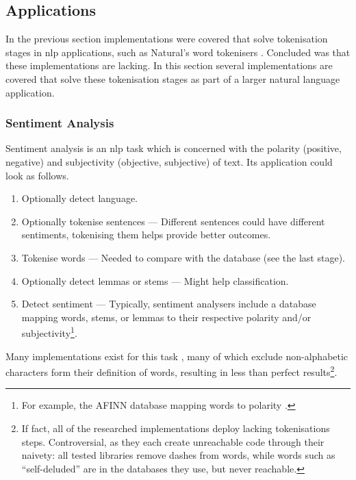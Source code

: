 \begin{enumerate}
\subsection{Applications}\label{applications}

In the previous section implementations were covered that solve
tokenisation stages in \gls{nlp} applications, such as Natural's word
tokenisers \autocite{NaturalNode/natural-source-code}. Concluded was
that these implementations are lacking. In this section several
implementations are covered that solve these tokenisation stages as part
of a larger natural language application.

\subsubsection{Sentiment Analysis}\label{sentiment-analysis}

Sentiment analysis is an \gls{nlp} task which is concerned with the
polarity (positive, negative) and subjectivity (objective, subjective)
of text. Its application could look as follows.

\begin{enumerate}
\item
  Optionally detect language.
\item
  Optionally tokenise sentences --- Different sentences could have
  different sentiments, tokenising them helps provide better outcomes.
\item
  Tokenise words --- Needed to compare with the database (see the last
  stage).
\item
  Optionally detect lemmas or stems --- Might help classification.
\item
  Detect sentiment --- Typically, sentiment analysers include a database
  mapping words, stems, or lemmas to their respective polarity and\slash or
  subjectivity\footnote{For example, the AFINN database mapping words to
    polarity \autocite{nielsen-finn-arup-afinn}.}.
\end{enumerate}

Many implementations exist for this task \autocites[e.g.,][]
{thinkroth/sentimental-source-code}{mileszim/sediment-source-code}
{thisandagain/sentiment-source-code}, many of which exclude non-alphabetic
characters form their definition of words, resulting in less than perfect
results\footnote{If fact, all of
  the researched implementations deploy lacking tokenisations steps.
  Controversial, as they each create unreachable code through their
  naivety: all tested libraries remove dashes from words, while words
  such as ``self-deluded'' are in the databases they use, but never
  reachable.}.


\end{enumerate}
